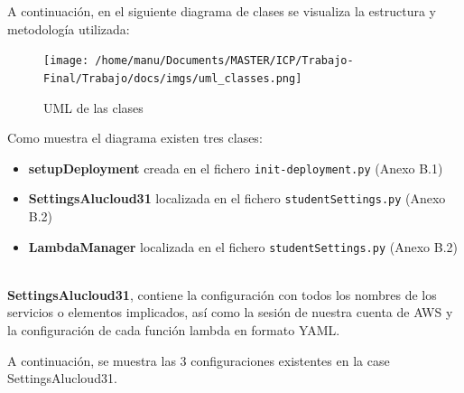 \documentclass[
]{article}
\begin{document}
A continuación, en el siguiente diagrama de clases se visualiza la
estructura y metodología utilizada:

\begin{figure}[H]
\centering
\texttt{[image: /home/manu/Documents/MASTER/ICP/Trabajo-Final/Trabajo/docs/imgs/uml\_classes.png]}
\caption{UML de las clases}
\end{figure}

Como muestra el diagrama existen tres clases:

\begin{itemize}
\item
  \textbf{setupDeployment} creada en el fichero
  \texttt{init-deployment.py} (Anexo B.1)
\item
  \textbf{SettingsAlucloud31} localizada en el fichero
  \texttt{studentSettings.py} (Anexo B.2)
\item
  \textbf{LambdaManager} localizada en el fichero
  \texttt{studentSettings.py} (Anexo B.2)
\end{itemize}
\leavevmode
\newline
\\
\textbf{SettingsAlucloud31}, contiene la configuración con todos los
nombres de los servicios o elementos implicados, así como la sesión de
nuestra cuenta de AWS y la configuración de cada función lambda en
formato YAML.

A continuación, se muestra las 3 configuraciones existentes en la case
SettingsAlucloud31.
\end{document}
